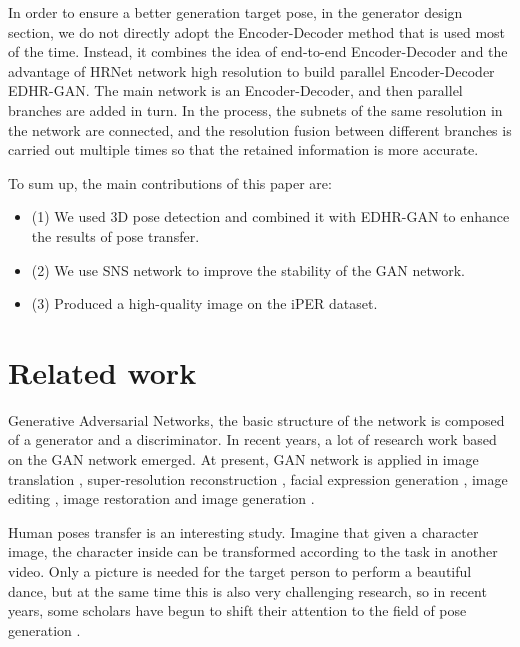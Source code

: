 In order to ensure a better generation target pose, in the generator design section, we do not directly adopt the Encoder-Decoder method that is used most of the time. Instead, it combines the idea of end-to-end Encoder-Decoder and the advantage of HRNet network high resolution to build parallel Encoder-Decoder EDHR-GAN. The main network is an Encoder-Decoder, and then parallel branches are added in turn. In the process, the subnets of the same resolution in the network are connected, and the resolution fusion between different branches is carried out multiple times so that the retained information is more accurate.
	
To sum up, the main contributions of this paper are:
\begin{itemize}
		\item[](1) We used 3D pose detection and combined it with EDHR-GAN to enhance the results of pose transfer.
		\item[](2) We use SNS network to improve the stability of the GAN network.
		\item[](3) Produced a high-quality image on the iPER dataset.
\end{itemize}
\section{Related work}
	
Generative Adversarial Networks, the basic structure of the network is composed of a generator and a discriminator. In recent years, a lot of research work based on the GAN network emerged. At present, GAN network is applied in image translation \cite{kim2017learning,zhu2017unpaired}, super-resolution reconstruction \cite{ledig2017photo,wang2015deep}, facial expression generation \cite{choi2018stargan,pumarola2018ganimation,li2016deep}, image editing \cite{brock2016neural,shu2017neural}, image restoration \cite{nazeri2019edgeconnect,zheng2019pluralistic,bertalmio2000image,liu2018image} and image generation \cite{arjovsky2017wasserstein,huang2017stacked,zhao2016energy}.
	
Human poses transfer is an interesting study. Imagine that given a character image, the character inside can be transformed according to the task in another video. Only a picture is needed for the target person to perform a beautiful dance, but at the same time this is also very challenging research, so in recent years, some scholars have begun to shift their attention to the field of pose generation \cite{chan2019everybody,zhu2019progressive,ma2017pose,ge2018fd,liu2019liquid,siarohin2018deformable,neverova2018dense}.
	
